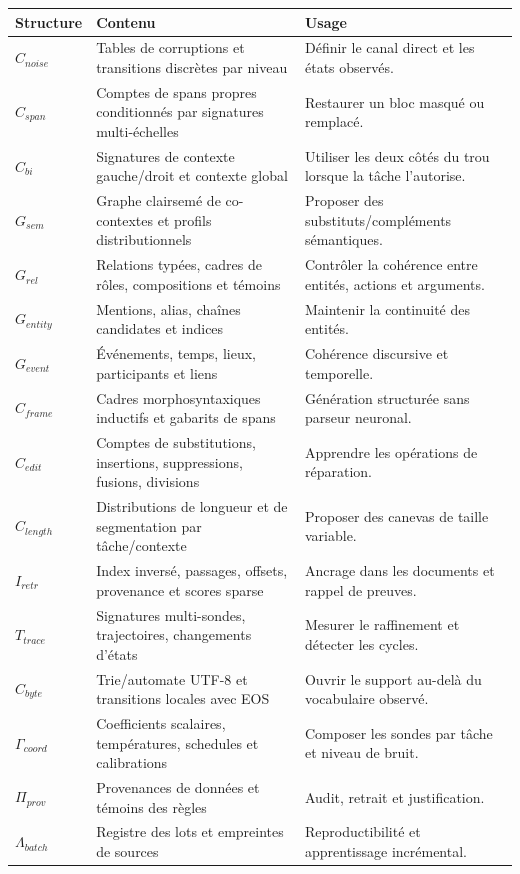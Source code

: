 \documentclass[11pt,a4paper,oneside]{report}
\begin{document}
\begin{longtable}{p{2.7cm}p{5.0cm}p{6.1cm}}
\toprule
Structure & Contenu & Usage \\
\midrule
$C_{noise}$ & Tables de corruptions et transitions discrètes par niveau & Définir le canal direct et les états observés.\\
$C_{span}$ & Comptes de spans propres conditionnés par signatures multi-échelles & Restaurer un bloc masqué ou remplacé.\\
$C_{bi}$ & Signatures de contexte gauche/droit et contexte global & Utiliser les deux côtés du trou lorsque la tâche l'autorise.\\
$G_{sem}$ & Graphe clairsemé de co-contextes et profils distributionnels & Proposer des substituts/compléments sémantiques.\\
$G_{rel}$ & Relations typées, cadres de rôles, compositions et témoins & Contrôler la cohérence entre entités, actions et arguments.\\
$G_{entity}$ & Mentions, alias, chaînes candidates et indices & Maintenir la continuité des entités.\\
$G_{event}$ & Événements, temps, lieux, participants et liens & Cohérence discursive et temporelle.\\
$C_{frame}$ & Cadres morphosyntaxiques inductifs et gabarits de spans & Génération structurée sans parseur neuronal.\\
$C_{edit}$ & Comptes de substitutions, insertions, suppressions, fusions, divisions & Apprendre les opérations de réparation.\\
$C_{length}$ & Distributions de longueur et de segmentation par tâche/contexte & Proposer des canevas de taille variable.\\
$I_{retr}$ & Index inversé, passages, offsets, provenance et scores sparse & Ancrage dans les documents et rappel de preuves.\\
$T_{trace}$ & Signatures multi-sondes, trajectoires, changements d'états & Mesurer le raffinement et détecter les cycles.\\
$C_{byte}$ & Trie/automate UTF-8 et transitions locales avec EOS & Ouvrir le support au-delà du vocabulaire observé.\\
$\Gamma_{coord}$ & Coefficients scalaires, températures, schedules et calibrations & Composer les sondes par tâche et niveau de bruit.\\
$\Pi_{prov}$ & Provenances de données et témoins des règles & Audit, retrait et justification.\\
$\Lambda_{batch}$ & Registre des lots et empreintes de sources & Reproductibilité et apprentissage incrémental.\\
\bottomrule
\end{longtable}
\end{document}
